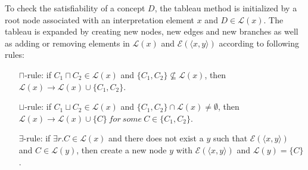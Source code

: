 \documentclass{article}
\begin{document}
To check the satisfiability of a concept $D$, the tableau method is initialized by a root node associated with an interpretation element $x$ and $D\in \mathcal{L}(x)$. 
The tableau is expanded by creating new nodes, new edges and new branches as well as adding or removing elements
in $\mathcal{L}(x)$ and  $\mathcal{E}(\langle x,y\rangle)$ according to following rules:
\begin{itemize}
\item[$\sqcap$-rule:] if $C_1\sqcap C_2\in \mathcal{L}(x)$ and $\{C_1,C_2\}\nsubseteq \mathcal{L}(x)$, then $ \mathcal{L}(x)\rightarrow  \mathcal{L}(x)\cup \{C_1,C_2\}$.
\begin{center}
\end{center}
\item[$\sqcup$-rule:] if $C_1\sqcup C_2\in \mathcal{L}(x)$ and $\{C_1,C_2\} \cap \mathcal{L}(x)\neq \emptyset$, then $ \mathcal{L}(x)\rightarrow 
\mathcal{L}(x)\cup \{C\}~for ~some ~C\in\{C_1,C_2\}$.
\begin{center}
\end{center}
\item[$\exists$-rule:]  if $\exists r.C\in \mathcal{L}(x)$ and there does not exist a $y$ such that $\mathcal{E}(\langle x,y \rangle)$ and $C\in \mathcal{L}(y)$, then create a new node $y$ 
with $\mathcal{E}(\langle x,y\rangle)$ and $\mathcal{L}(y)=\{C\}$.
\begin{center}
\end{center}


\end{itemize}
\end{document}
